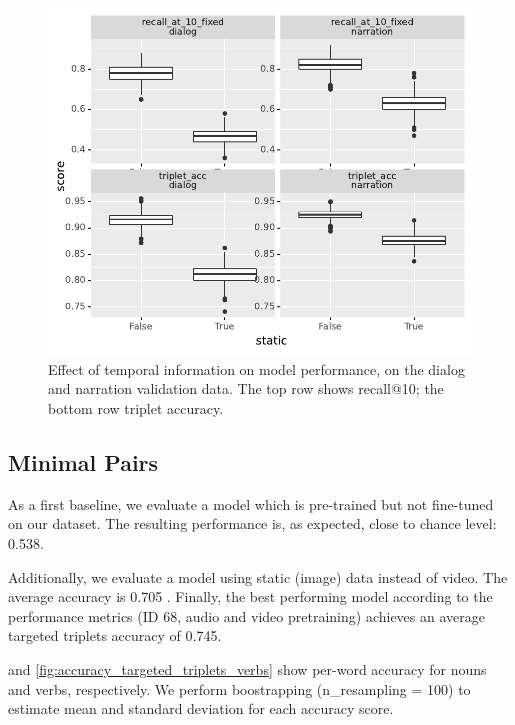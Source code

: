 \begin{figure}[htb]
  \centering
  \includegraphics[width=\columnwidth]{results/ablations/static.pdf}
  \caption{Effect of temporal information on model performance, on the dialog
          and narration validation data. The top row shows recall@10;
          the bottom row triplet accuracy.}
  \label{fig:static}
\end{figure}


\subsection{Minimal Pairs}
\label{sec:minimal-pairs}
As a first baseline, we evaluate a model which is pre-trained but not
fine-tuned on our dataset. The resulting performance is, as expected,
close to chance level: 0.538.

Additionally, we evaluate a model using static (image)
data instead of video. The average accuracy is 0.705 . Finally, the
best performing model according to the performance metrics (ID 68,
audio and video pretraining) achieves an average targeted triplets
accuracy of 0.745.

 and
\ref{fig:accuracy_targeted_triplets_verbs} show per-word
accuracy for nouns and verbs, respectively.
We perform boostrapping (n\_resampling = 100) to estimate mean and standard deviation for each accuracy score.

